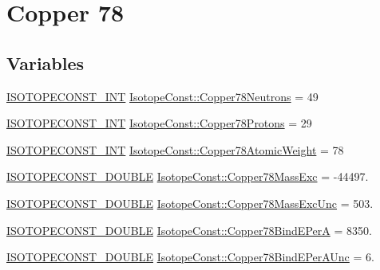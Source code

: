\hypertarget{group___isotope_const-_copper-_cu78}{}\section{Copper 78}
\label{group___isotope_const-_copper-_cu78}
\subsection*{Variables}
\begin{DoxyCompactItemize}
\item 
\mbox{\hyperlink{group___isotope_const-_macros_ga5f18360b3e99483a35c32d789e62621c}{I\+S\+O\+T\+O\+P\+E\+C\+O\+N\+S\+T\+\_\+\+I\+NT}} \mbox{\hyperlink{group___isotope_const-_copper-_cu78_gaeb961678c6c8bb5e660470b46d5a8be7}{Isotope\+Const\+::\+Copper78\+Neutrons}} = 49
\item 
\mbox{\hyperlink{group___isotope_const-_macros_ga5f18360b3e99483a35c32d789e62621c}{I\+S\+O\+T\+O\+P\+E\+C\+O\+N\+S\+T\+\_\+\+I\+NT}} \mbox{\hyperlink{group___isotope_const-_copper-_cu78_gaf2fb7b9034310007509243d9cdd76b8e}{Isotope\+Const\+::\+Copper78\+Protons}} = 29
\item 
\mbox{\hyperlink{group___isotope_const-_macros_ga5f18360b3e99483a35c32d789e62621c}{I\+S\+O\+T\+O\+P\+E\+C\+O\+N\+S\+T\+\_\+\+I\+NT}} \mbox{\hyperlink{group___isotope_const-_copper-_cu78_ga001ae94b460db5aa97dab62576d5f672}{Isotope\+Const\+::\+Copper78\+Atomic\+Weight}} = 78
\item 
\mbox{\hyperlink{group___isotope_const-_macros_ga8f45a7272ce02c0b4c65c44636ed719a}{I\+S\+O\+T\+O\+P\+E\+C\+O\+N\+S\+T\+\_\+\+D\+O\+U\+B\+LE}} \mbox{\hyperlink{group___isotope_const-_copper-_cu78_gaac5fdadc0783a2ff77b1e011ad9859f8}{Isotope\+Const\+::\+Copper78\+Mass\+Exc}} = -\/44497.
\item 
\mbox{\hyperlink{group___isotope_const-_macros_ga8f45a7272ce02c0b4c65c44636ed719a}{I\+S\+O\+T\+O\+P\+E\+C\+O\+N\+S\+T\+\_\+\+D\+O\+U\+B\+LE}} \mbox{\hyperlink{group___isotope_const-_copper-_cu78_ga355d7ff4ebd7f38fbf381c8be361434b}{Isotope\+Const\+::\+Copper78\+Mass\+Exc\+Unc}} = 503.
\item 
\mbox{\hyperlink{group___isotope_const-_macros_ga8f45a7272ce02c0b4c65c44636ed719a}{I\+S\+O\+T\+O\+P\+E\+C\+O\+N\+S\+T\+\_\+\+D\+O\+U\+B\+LE}} \mbox{\hyperlink{group___isotope_const-_copper-_cu78_ga777ca1075c5105912891e58417e8c032}{Isotope\+Const\+::\+Copper78\+Bind\+E\+PerA}} = 8350.
\item 
\mbox{\hyperlink{group___isotope_const-_macros_ga8f45a7272ce02c0b4c65c44636ed719a}{I\+S\+O\+T\+O\+P\+E\+C\+O\+N\+S\+T\+\_\+\+D\+O\+U\+B\+LE}} \mbox{\hyperlink{group___isotope_const-_copper-_cu78_gadf92d2f6dccc839beed9c380e3d58b54}{Isotope\+Const\+::\+Copper78\+Bind\+E\+Per\+A\+Unc}} = 6.

\end{DoxyCompactItemize}
